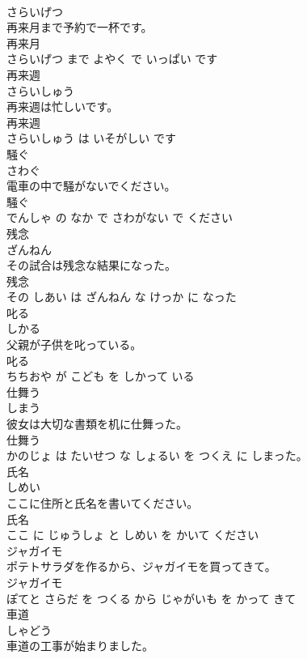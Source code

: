 \documentclass[8pt]{extreport}
\begin{document}
\begin{CJK}{UTF8}{min}
\\	さらいげつ			
\\	再来月まで予約で一杯です。	
\\	再来月 
\\	さらいげつ まで よやく で いっぱい です			
\\	再来週	
\\	さらいしゅう			
\\	再来週は忙しいです。	
\\	再来週 
\\	さらいしゅう は いそがしい です			
\\	騒ぐ	
\\	さわぐ			
\\	電車の中で騒がないでください。	
\\	騒ぐ 
\\	でんしゃ の なか で さわがない で ください			
\\	残念	
\\	ざんねん			
\\	その試合は残念な結果になった。	
\\	残念 
\\	その しあい は ざんねん な けっか に なった			
\\	叱る	
\\	しかる			
\\	父親が子供を叱っている。	
\\	叱る 
\\	ちちおや が こども を しかって いる			
\\	仕舞う	
\\	しまう			
\\	彼女は大切な書類を机に仕舞った。	
\\	仕舞う 
\\	かのじょ は たいせつ な しょるい を つくえ に しまった。			
\\	氏名	
\\	しめい			
\\	ここに住所と氏名を書いてください。	
\\	氏名 
\\	ここ に じゅうしょ と しめい を かいて ください			
\\	ジャガイモ	
\\	ポテトサラダを作るから、ジャガイモを買ってきて。	
\\	ジャガイモ 
\\	ぽてと さらだ を つくる から じゃがいも を かって きて			
\\	車道	
\\	しゃどう			
\\	車道の工事が始まりました。	

\end{CJK}
\end{document}
